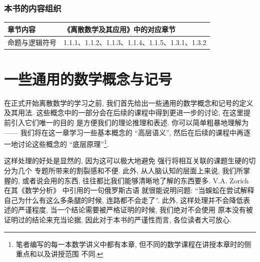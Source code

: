 \documentclass[10pt,UTF8]{book} %
\begin{document}
\subsection*{本书的内容组织}

{
\begin{longtable}{p{}|p{}}
    \toprule
    \textbf{章节内容} & \textbf{《离散数学及其应用》中的对应章节} \\
    \midrule
    \endhead
    \bottomrule
    \endfoot

    命题与逻辑符号 & 1.1.1、1.1.2、1.1.3、1.1.4、1.1.5、1.3.1、1.3.2 \\
\end{longtable}}




\newpage
\thispagestyle{empty}

\pagestyle{plain}
{\tableofcontents}
\newpage
\thispagestyle{empty}
\cleardoublepage %


\makeatletter
\let\ps@plain\ps@empty
\makeatother

\mainmatter

\chapter{一些通用的数学概念与记号}

在正式开始离散数学的学习之前, 我们首先给出一些通用的数学概念和记号的定义及其用法.
这些概念中的一部分会在后续的课程中得到更进一步的讨论, 在这里提前引入它们唯一的目的
是方便我们的理论推理和表述. 你可以简单粗暴地理解为 —— 我们将在这一章学习一些基本概念的
“高层语义”, 然后在后续的课程中再逐一地讨论这些概念的 “底层原理”\footnote{
    笔者编写的每一本数学讲义中都有本章, 但不同的数学课程在讲授本章时的侧重点和以及讲授范围
    不同.
}.

这样处理的好处是显然的, 因为这可以极大地避免 {\kaishu 强行将相互关联的课题生硬的切分为几个
专题所带来的割裂感和不便}. 此外, 从人脑认知的层面上来说, 我们所掌握的, 或者说会用的东西,
往往都比我们能够清晰地了解的东西要多. V.A. Zorich 在其《数学分析》\cite{zorich1} 中引用的一句俄罗斯古语
就很能说明问题: {\kaishu “当蜈蚣在尝试解释自己为什么有这么多条腿的时候, 连路都不会走了”}.
此外, 这样处理并不会降低表述的严谨程度, 当一个结论需要被严格证明的时候, 我们绝对不会使用
原本没有被证明过的结论来充当论据, 因此对于本书的严谨性而言, 各位读者大可放心.
\end{document}

